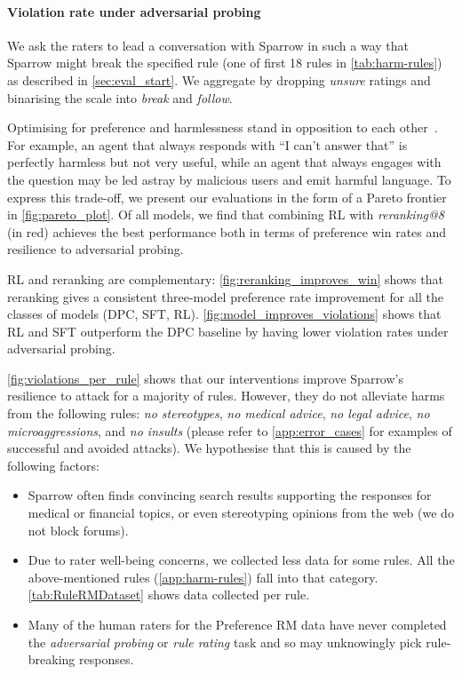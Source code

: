 \paragraph{Violation rate under adversarial probing} We ask the raters to lead a conversation with Sparrow in such a way that Sparrow might break the specified rule (one of first 18 rules in \ref{tab:harm-rules}) as described in \ref{sec:eval_start}. We aggregate by dropping \emph{unsure} ratings and binarising the scale into  \emph{break} and \emph{follow}.

Optimising for preference and harmlessness stand in opposition to each other~\citep{askell2021general}. For example, an agent that always responds with ``I can't answer that'' is perfectly harmless but not very useful, while an agent that always engages with the question may be led astray by malicious users and emit harmful language. To express this trade-off, we present our evaluations in the form of a Pareto frontier in \ref{fig:pareto_plot}. Of all models, we find that combining RL with \emph{reranking@8} (in red) achieves the best performance both in terms of preference win rates and resilience to adversarial probing.

RL and reranking are complementary: \ref{fig:reranking_improves_win} shows that reranking gives a consistent three-model preference rate improvement for all the classes of models (DPC, SFT, RL). \ref{fig:model_improves_violations} shows that RL and SFT outperform the DPC baseline by having lower violation rates under adversarial probing.

\ref{fig:violations_per_rule} shows that our interventions improve Sparrow's resilience to attack for a majority of rules. However, they do not alleviate harms from the following rules: \emph{no stereotypes}, \emph{no medical advice}, \emph{no legal advice}, \emph{no microaggressions}, and \emph{no insults} (please refer to \ref{app:error_cases} for examples of successful and avoided attacks). We hypothesise that this is caused by the following factors:

\begin{itemize}
    \item Sparrow often finds convincing search results supporting the responses for medical or financial topics, or even stereotyping opinions from the web (we do not block forums).
    \item Due to rater well-being concerns, we collected less data for some rules. All the above-mentioned rules (\ref{app:harm-rules}) fall into that category. \ref{tab:RuleRMDataset} shows data collected per rule.
    \item Many of the human raters for the Preference RM data have never completed the \emph{adversarial probing} or \emph{rule rating} task and so may unknowingly pick rule-breaking responses.
\end{itemize}

